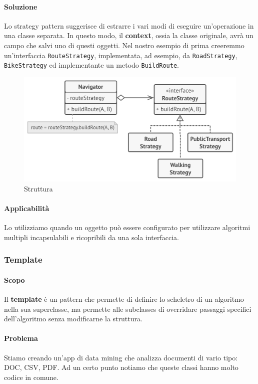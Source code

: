 \documentclass[11pt]{article}
\newcommand{\code}[1]{\texttt{#1}}
\begin{document}
\paragraph{Soluzione}
Lo strategy pattern suggerisce di estrarre i vari modi di eseguire un'operazione in una classe separata. In questo modo, il \textbf{context}, ossia la classe originale, avrà un campo che salvi uno di questi oggetti. Nel nostro esempio di prima creeremmo un'interfaccia \code{RouteStrategy}, implementata, ad esempio, da \code{RoadStrategy}, \code{BikeStrategy} ed implementante un metodo \code{BuildRoute}. 
\begin{figure}[H]
    \includegraphics[width=\linewidth]{res/teoria/Strategy.png}
    \caption{Struttura}
\end{figure}
\paragraph{Applicabilità}
Lo utilizziamo quando un oggetto può essere configurato per utilizzare algoritmi multipli incapsulabili e ricopribili da una sola interfaccia.

\subsubsection{Template}
\paragraph{Scopo}
Il \textbf{template} è un pattern che permette di definire lo scheletro di un algoritmo nella sua superclasse, ma permette alle subclasses di overridare passaggi specifici dell'algoritmo senza modificarne la struttura.  
\paragraph{Problema}
Stiamo creando un'app di data mining che analizza documenti di vario tipo: DOC, CSV, PDF. Ad un certo punto notiamo che queste classi hanno molto codice in comune. 
\end{document}
